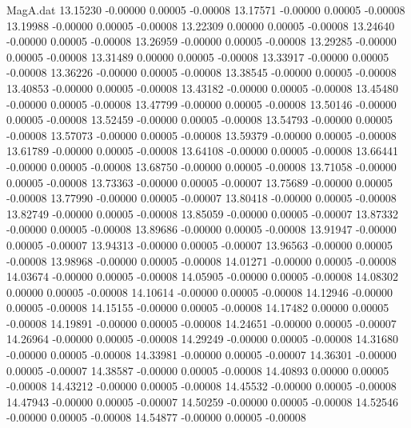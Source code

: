 \begin{filecontents}{MagA.dat}
  13.15230   -0.00000    0.00005   -0.00008
  13.17571   -0.00000    0.00005   -0.00008
  13.19988   -0.00000    0.00005   -0.00008
  13.22309    0.00000    0.00005   -0.00008
  13.24640   -0.00000    0.00005   -0.00008
  13.26959   -0.00000    0.00005   -0.00008
  13.29285   -0.00000    0.00005   -0.00008
  13.31489    0.00000    0.00005   -0.00008
  13.33917   -0.00000    0.00005   -0.00008
  13.36226   -0.00000    0.00005   -0.00008
  13.38545   -0.00000    0.00005   -0.00008
  13.40853   -0.00000    0.00005   -0.00008
  13.43182   -0.00000    0.00005   -0.00008
  13.45480   -0.00000    0.00005   -0.00008
  13.47799   -0.00000    0.00005   -0.00008
  13.50146   -0.00000    0.00005   -0.00008
  13.52459   -0.00000    0.00005   -0.00008
  13.54793   -0.00000    0.00005   -0.00008
  13.57073   -0.00000    0.00005   -0.00008
  13.59379   -0.00000    0.00005   -0.00008
  13.61789   -0.00000    0.00005   -0.00008
  13.64108   -0.00000    0.00005   -0.00008
  13.66441   -0.00000    0.00005   -0.00008
  13.68750   -0.00000    0.00005   -0.00008
  13.71058   -0.00000    0.00005   -0.00008
  13.73363   -0.00000    0.00005   -0.00007
  13.75689   -0.00000    0.00005   -0.00008
  13.77990   -0.00000    0.00005   -0.00007
  13.80418   -0.00000    0.00005   -0.00008
  13.82749   -0.00000    0.00005   -0.00008
  13.85059   -0.00000    0.00005   -0.00007
  13.87332   -0.00000    0.00005   -0.00008
  13.89686   -0.00000    0.00005   -0.00008
  13.91947   -0.00000    0.00005   -0.00007
  13.94313   -0.00000    0.00005   -0.00007
  13.96563   -0.00000    0.00005   -0.00008
  13.98968   -0.00000    0.00005   -0.00008
  14.01271   -0.00000    0.00005   -0.00008
  14.03674   -0.00000    0.00005   -0.00008
  14.05905   -0.00000    0.00005   -0.00008
  14.08302    0.00000    0.00005   -0.00008
  14.10614   -0.00000    0.00005   -0.00008
  14.12946   -0.00000    0.00005   -0.00008
  14.15155   -0.00000    0.00005   -0.00008
  14.17482    0.00000    0.00005   -0.00008
  14.19891   -0.00000    0.00005   -0.00008
  14.24651   -0.00000    0.00005   -0.00007
  14.26964   -0.00000    0.00005   -0.00008
  14.29249   -0.00000    0.00005   -0.00008
  14.31680   -0.00000    0.00005   -0.00008
  14.33981   -0.00000    0.00005   -0.00007
  14.36301   -0.00000    0.00005   -0.00007
  14.38587   -0.00000    0.00005   -0.00008
  14.40893    0.00000    0.00005   -0.00008
  14.43212   -0.00000    0.00005   -0.00008
  14.45532   -0.00000    0.00005   -0.00008
  14.47943   -0.00000    0.00005   -0.00007
  14.50259   -0.00000    0.00005   -0.00008
  14.52546   -0.00000    0.00005   -0.00008
  14.54877   -0.00000    0.00005   -0.00008

\end{filecontents}
